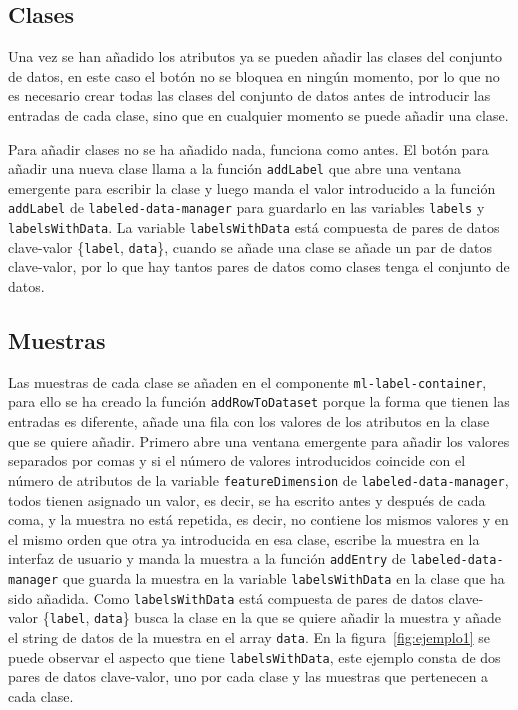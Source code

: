 \documentclass[a4paper, 12pt]{book}
\begin{document}
\subsection{Clases}
\label{subsec:clases}

Una vez se han añadido los atributos ya se pueden añadir las clases del conjunto de datos, en este caso el botón no se bloquea en ningún momento, por lo que no es necesario crear todas las clases del conjunto de datos antes de introducir las entradas de cada clase, sino que en cualquier momento se puede añadir una clase. 

Para añadir clases no se ha añadido nada, funciona como antes. 
El botón para añadir una nueva clase llama a la función \texttt{addLabel} que abre una ventana emergente para escribir la clase y luego manda el valor introducido a la función \texttt{addLabel} de \texttt{labeled-data-manager} para guardarlo en las variables \texttt{labels} y \texttt{labelsWithData}. 
La variable \texttt{labelsWithData} está compuesta de pares de datos clave-valor \{\texttt{label}, \texttt{data}\}, cuando se añade una clase se añade un par de datos clave-valor, por lo que hay tantos pares de datos como clases tenga el conjunto de datos.

\subsection{Muestras}
\label{subsec:datos}

Las muestras de cada clase se añaden en el componente \texttt{ml-label-container}, para ello se ha creado la función \texttt{addRowToDataset} porque la forma que tienen las entradas es diferente, añade una fila con los valores de los atributos en la clase que se quiere añadir. 
Primero abre una ventana emergente para añadir los valores separados por comas y si el número de valores introducidos coincide con el número de atributos de la variable \texttt{featureDimension} de \texttt{labeled-data-manager}, todos tienen asignado un valor, es decir, se ha escrito antes y después de cada coma, y la muestra no está repetida, es decir, no contiene los mismos valores y en el mismo orden que otra ya introducida en esa clase, escribe la muestra en la interfaz de usuario y manda la muestra a la función \texttt{addEntry} de \texttt{labeled-data-manager} que guarda la muestra en la variable \texttt{labelsWithData} en la clase que ha sido añadida. Como \texttt{labelsWithData} está compuesta de pares de datos clave-valor \{\texttt{label}, \texttt{data}\} busca la clase en la que se quiere añadir la muestra y añade el string de datos de la muestra en el array \texttt{data}. 
En la figura~\ref{fig:ejemplo1} se puede observar el aspecto que tiene \texttt{labelsWithData}, este ejemplo consta de dos pares de datos clave-valor, uno por cada clase y las muestras que pertenecen a cada clase.
\end{document}
